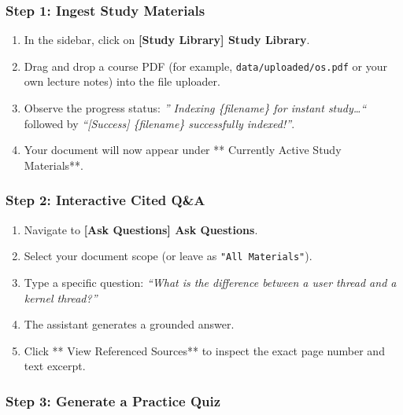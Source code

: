 \documentclass[
]{article}
\providecommand{\tightlist}{%
  \setlength{\itemsep}{0pt}\setlength{\parskip}{0pt}}
\begin{document}
\subsubsection{Step 1: Ingest Study
Materials}\label{step-1-ingest-study-materials}

\begin{enumerate}
\def\labelenumi{\arabic{enumi}.}
\tightlist
\item
  In the sidebar, click on \textbf{{[}Study Library{]} Study Library}.
\item
  Drag and drop a course PDF (for example, \texttt{data/\allowbreak uploaded/\allowbreak os.\allowbreak pdf}
  or your own lecture notes) into the file uploader.
\item
  Observe the progress status: \emph{'' Indexing \{filename\} for
  instant study\ldots``} followed by \emph{``{[}Success{]} \{filename\}
  successfully indexed!''}.
\item
  Your document will now appear under ** Currently Active Study
  Materials**.
\end{enumerate}

\subsubsection{Step 2: Interactive Cited
Q\&A}\label{step-2-interactive-cited-qa}

\begin{enumerate}
\def\labelenumi{\arabic{enumi}.}
\tightlist
\item
  Navigate to \textbf{{[}Ask Questions{]} Ask Questions}.
\item
  Select your document scope (or leave as \texttt{"All\ \allowbreak Materials"}).
\item
  Type a specific question: \emph{``What is the difference between a
  user thread and a kernel thread?''}
\item
  The assistant generates a grounded answer.
\item
  Click ** View Referenced Sources** to inspect the exact page number
  and text excerpt.
\end{enumerate}

\subsubsection{Step 3: Generate a Practice
Quiz}\label{step-3-generate-a-practice-quiz}
\end{document}

